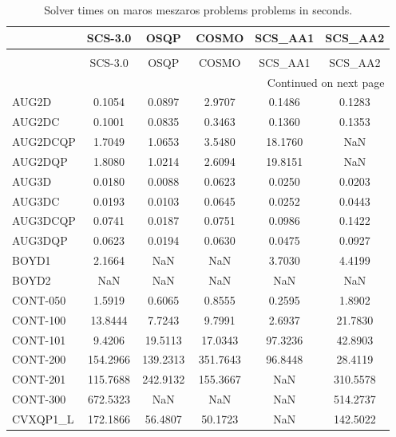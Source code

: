 \begin{longtable}{lccccc}
\caption{Solver times on maros meszaros problems problems in seconds.}
\label{t-maros meszaros problems-results}\\
\toprule
{} &  SCS-3.0 &     OSQP &    COSMO &  SCS\_AA1 &  SCS\_AA2 \\
\midrule
\endfirsthead
\caption[]{Solver times on maros meszaros problems problems in seconds.} \\
\toprule
{} &  SCS-3.0 &     OSQP &    COSMO &  SCS\_AA1 &  SCS\_AA2 \\
\midrule
\endhead
\midrule
\multicolumn{6}{r}{{Continued on next page}} \\
\midrule
\endfoot

\bottomrule
\endlastfoot
AUG2D    &   0.1054 &   0.0897 &   2.9707 &   0.1486 &   0.1283 \\
AUG2DC   &   0.1001 &   0.0835 &   0.3463 &   0.1360 &   0.1353 \\
AUG2DCQP &   1.7049 &   1.0653 &   3.5480 &  18.1760 &      NaN \\
AUG2DQP  &   1.8080 &   1.0214 &   2.6094 &  19.8151 &      NaN \\
AUG3D    &   0.0180 &   0.0088 &   0.0623 &   0.0250 &   0.0203 \\
AUG3DC   &   0.0193 &   0.0103 &   0.0645 &   0.0252 &   0.0443 \\
AUG3DCQP &   0.0741 &   0.0187 &   0.0751 &   0.0986 &   0.1422 \\
AUG3DQP  &   0.0623 &   0.0194 &   0.0630 &   0.0475 &   0.0927 \\
BOYD1    &   2.1664 &      NaN &      NaN &   3.7030 &   4.4199 \\
BOYD2    &      NaN &      NaN &      NaN &      NaN &      NaN \\
CONT-050 &   1.5919 &   0.6065 &   0.8555 &   0.2595 &   1.8902 \\
CONT-100 &  13.8444 &   7.7243 &   9.7991 &   2.6937 &  21.7830 \\
CONT-101 &   9.4206 &  19.5113 &  17.0343 &  97.3236 &  42.8903 \\
CONT-200 & 154.2966 & 139.2313 & 351.7643 &  96.8448 &  28.4119 \\
CONT-201 & 115.7688 & 242.9132 & 155.3667 &      NaN & 310.5578 \\
CONT-300 & 672.5323 &      NaN &      NaN &      NaN & 514.2737 \\
CVXQP1\_L & 172.1866 &  56.4807 &  50.1723 &      NaN & 142.5022 \\

\end{longtable}

